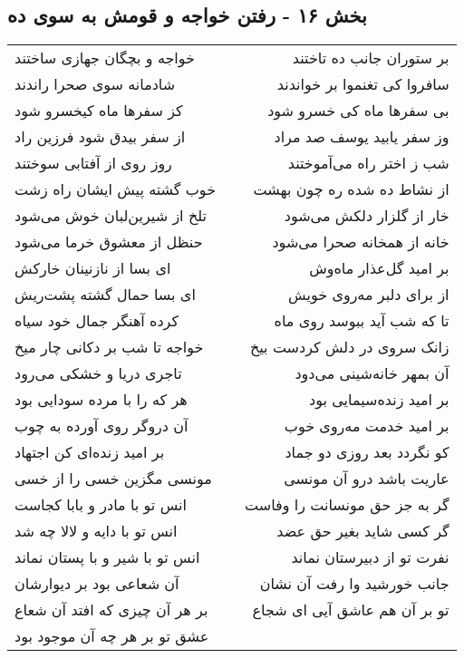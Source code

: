 \begin{center}
\section*{بخش ۱۶ - رفتن خواجه و قومش به سوی ده}
\label{sec:sh016}
\begin{longtable}{l p{0.5cm} r}
خواجه و بچگان جهازی ساختند
&&
بر ستوران جانب ده تاختند
\\
شادمانه سوی صحرا راندند
&&
سافروا کی تغنموا بر خواندند
\\
کز سفرها ماه کیخسرو شود
&&
بی سفرها ماه کی خسرو شود
\\
از سفر بیدق شود فرزین راد
&&
وز سفر یابید یوسف صد مراد
\\
روز روی از آفتابی سوختند
&&
شب ز اختر راه می‌آموختند
\\
خوب گشته پیش ایشان راه زشت
&&
از نشاط ده شده ره چون بهشت
\\
تلخ از شیرین‌لبان خوش می‌شود
&&
خار از گلزار دلکش می‌شود
\\
حنظل از معشوق خرما می‌شود
&&
خانه از همخانه صحرا می‌شود
\\
ای بسا از نازنینان خارکش
&&
بر امید گل‌عذار ماه‌وش
\\
ای بسا حمال گشته پشت‌ریش
&&
از برای دلبر مه‌روی خویش
\\
کرده آهنگر جمال خود سیاه
&&
تا که شب آید ببوسد روی ماه
\\
خواجه تا شب بر دکانی چار میخ
&&
زانک سروی در دلش کردست بیخ
\\
تاجری دریا و خشکی می‌رود
&&
آن بمهر خانه‌شینی می‌دود
\\
هر که را با مرده سودایی بود
&&
بر امید زنده‌سیمایی بود
\\
آن دروگر روی آورده به چوب
&&
بر امید خدمت مه‌روی خوب
\\
بر امید زنده‌ای کن اجتهاد
&&
کو نگردد بعد روزی دو جماد
\\
مونسی مگزین خسی را از خسی
&&
عاریت باشد درو آن مونسی
\\
انس تو با مادر و بابا کجاست
&&
گر به جز حق مونسانت را وفاست
\\
انس تو با دایه و لالا چه شد
&&
گر کسی شاید بغیر حق عضد
\\
انس تو با شیر و با پستان نماند
&&
نفرت تو از دبیرستان نماند
\\
آن شعاعی بود بر دیوارشان
&&
جانب خورشید وا رفت آن نشان
\\
بر هر آن چیزی که افتد آن شعاع
&&
تو بر آن هم عاشق آیی ای شجاع
\\
عشق تو بر هر چه آن موجود بود
&&

\end{longtable}
\end{center}
